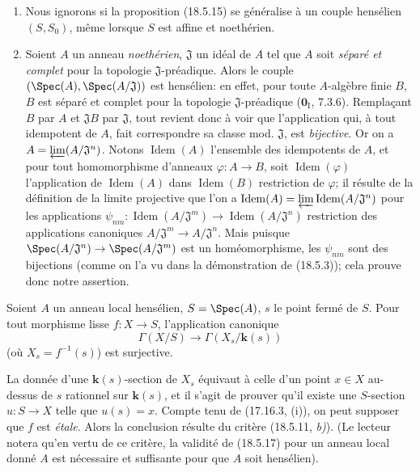 \begin{remarks}[18.5.16]
\label{IV.18.5.16}
\begin{enumerate}
  \item[(i)] Nous ignorons si la proposition (18.5.15) se généralise à un couple hensélien $(S,S_0)$, même lorsque $S$ est affine et noethérien.
  \item[(ii)] Soient $A$ un anneau \emph{noethérien}, $\mathfrak J$ un idéal de $A$ tel que $A$ soit \emph{séparé et complet} pour la topologie $\mathfrak J$-préadique. Alors le couple $(\Spec(A),\Spec(A/\mathfrak J))$ est hensélien: en effet, pour toute $A$-algèbre finie $B$, $B$ est séparé et complet pour la topologie $\mathfrak J$-préadique ($\mathbf{0}_{\mathrm I}$, 7.3.6). Remplaçant $B$ par $A$ et $\mathfrak J B$ par $\mathfrak J$, tout revient donc à voir que l'application qui, à tout idempotent de $A$, fait correspondre sa classe mod. $\mathfrak J$, est \emph{bijective}. Or on a $A=\varprojlim (A/\mathfrak J^n)$. Notons $\operatorname{Idem}(A)$ l'ensemble des idempotents de $A$, et pour tout homomorphisme d'anneaux $\varphi:A\to B$, soit $\operatorname{Idem}(\varphi)$ l'application de $\operatorname{Idem}(A)$ dans $\operatorname{Idem}(B)$ restriction de $\varphi$; il résulte de la définition de la limite projective que l'on a $\operatorname{Idem}(A)=\varprojlim\operatorname{Idem}(A/\mathfrak J^n)$ pour les applications $\psi_{nm}:\operatorname{Idem}(A/\mathfrak J^m)\to\operatorname{Idem}(A/\mathfrak J^n)$ restriction des applications canoniques $A/\mathfrak J^m\to A/\mathfrak J^n$. Mais puisque $\Spec(A/\mathfrak J^n)\to\Spec(A/\mathfrak J^m)$ est un homéomorphisme, les $\psi_{nm}$ sont des bijections (comme on l'a vu dans la démonstration de (18.5.3)); cela prouve donc notre assertion.
\end{enumerate}
\end{remarks}

\begin{theorem}[18.5.17]
\label{IV.18.5.17}
Soient $A$ un anneau local hensélien, $S=\Spec(A)$, $s$ le point fermé de $S$. Pour tout morphisme lisse $f:X\to S$, l'application canonique
\[
  \Gamma(X/S)\longrightarrow\Gamma(X_s/\boldsymbol{k}(s))
\]
\textup{(}où $X_s=f^{-1}(s)$\textup{)} est surjective.
\end{theorem}

La donnée d'une $\boldsymbol{k}(s)$-section de $X_s$ équivaut à celle d'un point $x\in X$ au-dessus de $s$ rationnel sur $\boldsymbol{k}(s)$, et il s'agit de prouver qu'il existe une $S$-section $u:S\to X$ telle que $u(s)=x$. Compte tenu de (17.16.3, (i)), on peut supposer que $f$ est \emph{étale}. Alors la conclusion résulte du critère (18.5.11, \emph{b)}). (Le lecteur notera qu'en vertu de ce critère, la validité de (18.5.17) pour un anneau local donné $A$ est nécessaire et suffisante pour que $A$ soit hensélien).

